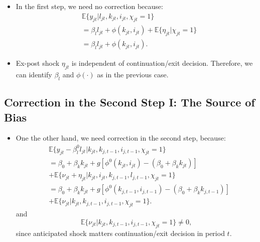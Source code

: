\documentclass[
]{book}
\providecommand{\tightlist}{%
  \setlength{\itemsep}{0pt}\setlength{\parskip}{0pt}}
\begin{document}
\begin{itemize}
\tightlist
\item
  In the first step, we need no correction because:
  \begin{equation}
  \begin{split}
  &\mathbb{E}\{y_{jt}|l_{jt}, k_{jt}, i_{jt}, \chi_{jt} = 1 \}\\
  &=\beta_l l_{jt} + \phi(k_{jt}, i_{jt}) + \mathbb{E}\{\eta_{jt}|\chi_{jt} = 1\}\\
  &= \beta_l l_{jt} + \phi(k_{jt}, i_{jt}).
  \end{split}
  \end{equation}
\item
  Ex-post shock \(\eta_{jt}\) is independent of continuation/exit decision.
  Therefore, we can identify \(\beta_l\) and \(\phi(\cdot)\) as in the previous case.
\end{itemize}

\hypertarget{correction-in-the-second-step-i-the-source-of-bias}{%
\subsection{Correction in the Second Step I: The Source of Bias}\label{correction-in-the-second-step-i-the-source-of-bias}}

\begin{itemize}
\tightlist
\item
  One the other hand, we need correction in the second step, because:
  \begin{equation}
  \begin{split}
  &\mathbb{E}\{y_{jt} - \beta_l^0 l_{jt}|k_{jt},  k_{j, t - 1}, i_{j, t - 1}, \chi_{jt} = 1\} \\
  &= \beta_0 + \beta_k k_{jt} + g[\phi^0(k_{jt}, i_{jt}) - (\beta_0 + \beta_k k_{jt})]\\
  & + \mathbb{E}\{\nu_{jt} + \eta_{jt}| k_{jt}, i_{jt}, k_{j, t - 1}, l_{j, t - 1}, \chi_{jt} = 1\}\\
  &= \beta_0 + \beta_k k_{jt} + g[\phi^0(k_{j, t - 1}, i_{j, t - 1}) - (\beta_0 + \beta_k k_{j, t - 1})]\\
  & + \mathbb{E}\{\nu_{jt}| k_{jt}, k_{j, t - 1}, i_{j, t - 1} , \chi_{jt} = 1\}.
  \end{split}
  \end{equation}
  and
  \begin{equation}
  \mathbb{E}\{\nu_{jt}| k_{jt}, k_{j, t - 1}, i_{j, t - 1}, \chi_{jt} = 1 \} \neq 0,
  \end{equation}
  since anticipated shock matters continuation/exit decision in period \(t\).
\end{itemize}
\end{document}
